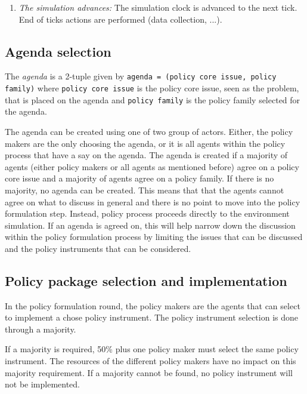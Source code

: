 \documentclass[11pt]{article}
\begin{document}
\begin{enumerate}
\item \emph{The simulation advances:} The simulation clock is advanced to the next tick. End of ticks actions are performed (data collection, ...).

\end{enumerate}

\subsection{Agenda selection}
\label{ssec:agendaSelection}

The \emph{agenda} is a 2-tuple given by \texttt{agenda = (policy core issue, policy family)} where \texttt{policy core issue} is the policy core issue, seen as the problem, that is placed on the agenda and \texttt{policy family} is the policy family selected for the agenda.

The agenda can be created using one of two group of actors. Either, the policy makers are the only choosing the agenda, or it is all agents within the policy process that have a say on the agenda. The agenda is created if a majority of agents (either policy makers or all agents as mentioned before) agree on a policy core issue and a majority of agents agree on a policy family. If there is no majority, no agenda can be created. This means that that the agents cannot agree on what to discuss in general and there is no point to move into the policy formulation step. Instead, policy process proceeds directly to the environment simulation. If an agenda is agreed on, this will help narrow down the discussion within the policy formulation process by limiting the issues that can be discussed and the policy instruments that can be considered.


\subsection{Policy package selection and implementation}
\label{ssec:policyPackageImplementation}

In the policy formulation round, the policy makers are the agents that can select to implement a chose policy instrument. The policy instrument selection is done through a majority.

If a majority is required, 50\% plus one policy maker must select the same policy instrument. The resources of the different policy makers have no impact on this majority requirement. If a majority cannot be found, no policy instrument will not be implemented.
\end{document}
